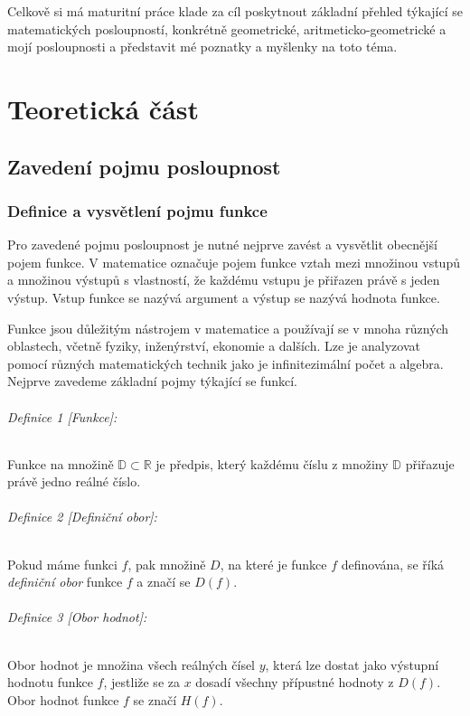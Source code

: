 \documentclass[12pt]{report}			%
\begin{document}
Celkově si má maturitní práce klade za cíl poskytnout základní přehled týkající se matematických posloupností, konkrétně geometrické, aritmeticko-geometrické a mojí posloupnosti a představit mé poznatky a myšlenky na toto téma.

	
	
	\part{Teoretická část}
	
		\chapter{Zavedení pojmu posloupnost}
		
			
			\section{Definice a vysvětlení pojmu funkce}
Pro zavedené pojmu posloupnost je nutné nejprve zavést a vysvětlit obecnější pojem funkce. V matematice označuje pojem funkce vztah mezi množinou vstupů a množinou výstupů s vlastností, že každému vstupu je přiřazen právě s jeden výstup. Vstup funkce se nazývá argument a výstup se nazývá hodnota funkce.

Funkce jsou důležitým nástrojem v matematice a používají se v mnoha různých oblastech, včetně fyziky, inženýrství, ekonomie a dalších. Lze je analyzovat pomocí různých matematických technik jako je infinitezimální počet a algebra. Nejprve zavedeme základní pojmy týkající se funkcí.


				\paragraph{Definice 1 [Funkce]:}
 Funkce na množině $\mathbb{D} \subset \mathbb{R}$ je předpis, který každému číslu z množiny  $\mathbb{D}$ přiřazuje právě jedno reálné číslo.

				\paragraph{Definice 2 [Definiční obor]:}
Pokud máme funkci $f$, pak množině $D$, na které je funkce $f$ definována, se říká \emph{definiční obor} funkce $f$ a značí se $D(f)$.
		\paragraph{Definice 3 [Obor hodnot]:}
Obor hodnot je množina všech reálných čísel $y$, která lze dostat jako výstupní hodnotu funkce $f$, jestliže se za $x$ dosadí všechny přípustné hodnoty z $D(f)$. Obor hodnot funkce $f$ se značí $H(f)$.
\newpage
\end{document}
